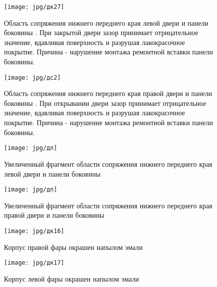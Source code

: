 {   
   
   
   
   \begin{figure}[H]\centering
   	\parbox[t]{0.49\textwidth}
   	{\centering
   		\texttt{[image: jpg/дк27]}
   		\caption{\footnotesize {Область сопряжения нижнего переднего края левой двери и панели боковины . При закрытой двери зазор принимает отрицательное значение, вдавливая поверхность и разрушая лакокрасочное покрытие. Причина - нарушение монтажа ремонтной вставки панели боковины.}}
   		\label{ris:images/b3}}
   	\hfil \hfil
   	\parbox[t]{0.49\textwidth}
   	{\centering
   		\texttt{[image: jpg/дс2]}
   		\caption{\footnotesize {Область сопряжения нижнего переднего края правой двери и панели боковины . При открывании двери зазор принимает отрицательное значение, вдавливая поверхность и разрушая лакокрасочное покрытие. Причина - нарушение монтажа ремонтной вставки панели боковины.}}
   		\label{ris:images/b4}}
   \end{figure}

%
\begin{figure}[H]\centering
	\parbox[t]{0.49\textwidth}
	{\centering
		\texttt{[image: jpg/дл]}
		\caption{\footnotesize {Увеличенный фрагмент области сопряжения нижнего переднего края левой двери и панели боковины }}
		\label{крайдвери}}
	\hfil \hfil
	\parbox[t]{0.49\textwidth}
	{\centering
		\texttt{[image: jpg/дп]}
		\caption{\footnotesize {Увеличенный фрагмент области сопряжения нижнего переднего края правой двери и панели боковины \тс}}
		\label{дп}}
\end{figure}
%
   
   \begin{figure}[H]\centering
   	\parbox[t]{0.49\textwidth}
   	{\centering
   		\texttt{[image: jpg/дк16]}
   		\caption{\footnotesize {Корпус правой фары окрашен напылом эмали}}
   		\label{фараправая}}
   	\hfil \hfil
   	\parbox[t]{0.49\textwidth}
   	{\centering
   		\texttt{[image: jpg/дк17]}
   		\caption{\footnotesize {Корпус левой фары окрашен напылом  эмали}}
   		\label{фаралевая}}
   \end{figure}



}
